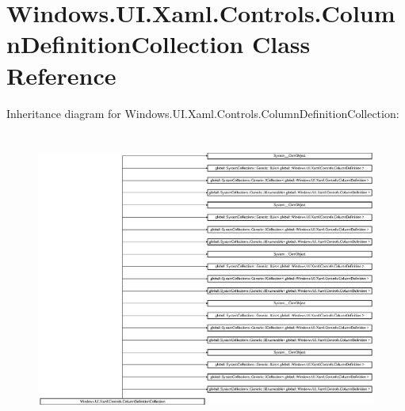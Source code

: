 \hypertarget{class_windows_1_1_u_i_1_1_xaml_1_1_controls_1_1_column_definition_collection}{}\section{Windows.\+U\+I.\+Xaml.\+Controls.\+Column\+Definition\+Collection Class Reference}
\label{class_windows_1_1_u_i_1_1_xaml_1_1_controls_1_1_column_definition_collection}
Inheritance diagram for Windows.\+U\+I.\+Xaml.\+Controls.\+Column\+Definition\+Collection\+:\begin{figure}[H]
\begin{center}
\leavevmode
\includegraphics[height=9.800001cm]{class_windows_1_1_u_i_1_1_xaml_1_1_controls_1_1_column_definition_collection}
\end{center}
\end{figure}
